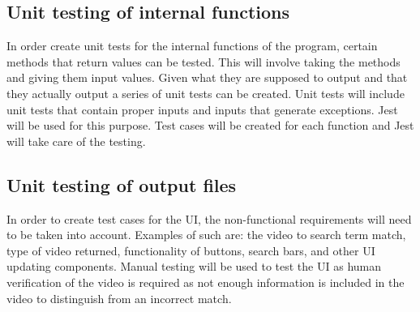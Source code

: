 \documentclass[12pt, titlepage]{article}
\begin{document}
\subsection{Unit testing of internal functions}
In order create unit tests for the internal functions of the program, certain methods that return values can be tested. This will involve taking the methods and giving them input values. Given what they are supposed to output and that they actually output a series of unit tests can be created. Unit tests will include unit tests that contain proper inputs and inputs that generate exceptions. Jest will be used for this purpose. Test cases will be created for each function and Jest will take care of the testing.
		
\subsection{Unit testing of output files}	
In order to create test cases for the UI, the non-functional requirements will need to be taken into account. Examples of such are: the video to search term match, type of video returned, functionality of buttons, search bars, and other UI updating components. Manual testing will be used to test the UI as human verification of the video is required as not enough information is included in the video to distinguish from an incorrect match.




\end{document}
